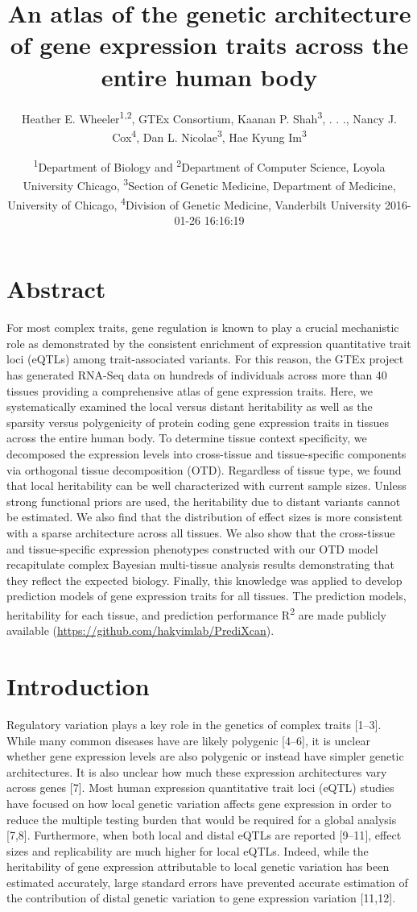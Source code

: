 \documentclass[]{article}
\title{An atlas of the genetic architecture of gene expression traits across
the entire human body}
\author{Heather E. Wheeler\textsuperscript{1,2}, GTEx Consortium, Kaanan P.
Shah\textsuperscript{3}, . . ., Nancy J. Cox\textsuperscript{4}, Dan L.
Nicolae\textsuperscript{3}, Hae Kyung Im\textsuperscript{3}}
\date{\textsuperscript{1}Department of Biology and
\textsuperscript{2}Department of Computer Science, Loyola University
Chicago, \textsuperscript{3}Section of Genetic Medicine, Department of
Medicine, University of Chicago, \textsuperscript{4}Division of Genetic
Medicine, Vanderbilt University 2016-01-26 16:16:19}
\begin{document}
\maketitle


\section{Abstract}\label{abstract}

For most complex traits, gene regulation is known to play a crucial
mechanistic role as demonstrated by the consistent enrichment of
expression quantitative trait loci (eQTLs) among trait-associated
variants. For this reason, the GTEx project has generated RNA-Seq data
on hundreds of individuals across more than 40 tissues providing a
comprehensive atlas of gene expression traits. Here, we systematically
examined the local versus distant heritability as well as the sparsity
versus polygenicity of protein coding gene expression traits in tissues
across the entire human body. To determine tissue context specificity,
we decomposed the expression levels into cross-tissue and
tissue-specific components via orthogonal tissue decomposition (OTD).
Regardless of tissue type, we found that local heritability can be well
characterized with current sample sizes. Unless strong functional priors
are used, the heritability due to distant variants cannot be estimated.
We also find that the distribution of effect sizes is more consistent
with a sparse architecture across all tissues. We also show that the
cross-tissue and tissue-specific expression phenotypes constructed with
our OTD model recapitulate complex Bayesian multi-tissue analysis
results demonstrating that they reflect the expected biology. Finally,
this knowledge was applied to develop prediction models of gene
expression traits for all tissues. The prediction models, heritability
for each tissue, and prediction performance R\textsuperscript{2} are
made publicly available (\url{https://github.com/hakyimlab/PrediXcan}).

\section{Introduction}\label{introduction}

Regulatory variation plays a key role in the genetics of complex traits
{[}1--3{]}. While many common diseases have are likely polygenic
{[}4--6{]}, it is unclear whether gene expression levels are also
polygenic or instead have simpler genetic architectures. It is also
unclear how much these expression architectures vary across genes
{[}7{]}. Most human expression quantitative trait loci (eQTL) studies
have focused on how local genetic variation affects gene expression in
order to reduce the multiple testing burden that would be required for a
global analysis {[}7,8{]}. Furthermore, when both local and distal eQTLs
are reported {[}9--11{]}, effect sizes and replicability are much higher
for local eQTLs. Indeed, while the heritability of gene expression
attributable to local genetic variation has been estimated accurately,
large standard errors have prevented accurate estimation of the
contribution of distal genetic variation to gene expression variation
{[}11,12{]}.
\end{document}
